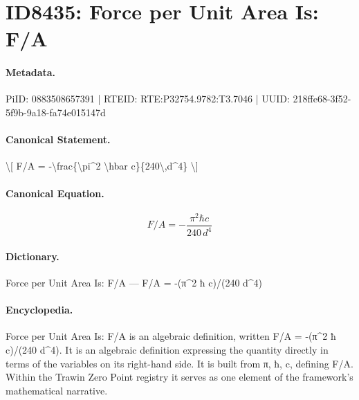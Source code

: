 \section*{ID8435: Force per Unit Area Is: F/A}
\paragraph{Metadata.}
PiID: 0883508657391 | RTEID: RTE:P32754.9782:T3.7046 | UUID: 218ffe68-3f52-5f9b-9a18-fa74e015147d

\paragraph{Canonical Statement.}
\textbackslash{}[ F/A = -\textbackslash{}frac\{\textbackslash{}pi\textasciicircum{}2 \textbackslash{}hbar c\}\{240\textbackslash{},d\textasciicircum{}4\} \textbackslash{}]

\paragraph{Canonical Equation.}
\[
F/A = -\frac{\pi^2 \hbar c}{240\,d^4}
\]

\paragraph{Dictionary.}
Force per Unit Area Is: F/A — F/A = -(π\textasciicircum{}2 ħ c)/(240 d\textasciicircum{}4)

\paragraph{Encyclopedia.}
Force per Unit Area Is: F/A is an algebraic definition, written F/A = -(π\textasciicircum{}2 ħ c)/(240 d\textasciicircum{}4). It is an algebraic definition expressing the quantity directly in terms of the variables on its right-hand side. It is built from π, ħ, c, defining F/A. Within the Trawin Zero Point registry it serves as one element of the framework's mathematical narrative.

